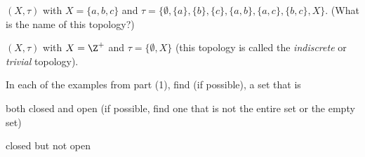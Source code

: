\begin{pa}
\begin{comment}
\end{comment}

	\item $(X, \tau)$ with $X = \{a,b,c\}$ and $\tau = \{\emptyset, \{a\}, \{b\},\{c\}, \{a,b\}, \{a,c\}, \{b,c\}, X \}$. (What is the name of this topology?)



\begin{comment}

\solution  Every subset is open, so this topology is the discrete topology. The closed sets are the complements of the open sets, so every subset is also closed. So the closed sets are 
\[X, \{b,c\}, \{a,c\}, \{a,b\}, \{c\}, \{b\},\{a\}, \text{ and } \emptyset.\]



\end{comment}

	\item $(X, \tau)$ with $X=\Z^+$ and $\tau = \{\emptyset, X\}$ (this topology is called the \emph{indiscrete} or \emph{trivial} topology). 



\begin{comment}

\solution The closed sets are the complements of the open sets, so the closed sets are 
\[X  \text{ and } \emptyset.\]



\end{comment}

	\ea


\item In each of the examples from part (1), find (if possible), a set that is
	\ba
	\item both closed and open (if possible, find one that is not the entire set or the empty set)
	
	

\begin{comment}

\solution In the topological space $(X, \tau)$ with $X= \{a,b,c,d,e,f\}$ and $\tau = \{\emptyset,\{a\}, \{c,d\}, \{a,c,d\}, \{b,c,d,e,f\}, X\}$ the set $\{a\}$ is both open and closed. 



\end{comment}
	
	\item closed but not open
	
	

\begin{comment}


\end{comment}
\end{pa}
